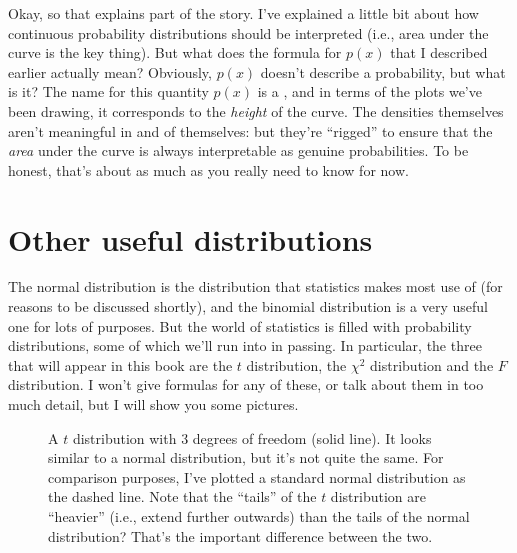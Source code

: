 Okay, so that explains part of the story. I've explained a little bit about how continuous probability distributions should be interpreted (i.e., area under the curve is the key thing). But what does the formula for $p(x)$ that I described earlier actually mean? Obviously, $p(x)$ doesn't describe a probability, but what is it? The name for this quantity $p(x)$ is a , and in terms of the plots we've been drawing, it corresponds to the {\it height} of the curve. The densities themselves aren't meaningful in and of themselves: but they're ``rigged'' to ensure that the {\it area} under the curve is always interpretable as genuine probabilities. To be honest, that's about as much as you really need to know for now.




\section{Other useful distributions~\label{sec:otherdists}}

The normal distribution is the distribution that statistics makes most use of (for reasons to be discussed shortly), and the binomial distribution is a very useful one for lots of purposes. But the world of statistics is filled with probability distributions, some of which we'll run into in passing. In particular, the three that will appear in this book are the $t$ distribution, the $\chi^2$ distribution and the $F$ distribution. I won't give formulas for any of these, or talk about them in too much detail, but I will show you some pictures. 


\begin{figure}
\begin{center}
\caption{A $t$ distribution with 3 degrees of freedom (solid line). It looks similar to a normal distribution, but it's not quite the same. For comparison purposes, I've plotted a standard normal distribution as the dashed line. Note that the ``tails'' of the $t$ distribution are ``heavier'' (i.e., extend further outwards) than the tails of the normal distribution? That's the important difference between the two. }
\label{fig:tdist}
\HR
\end{center}
\end{figure}

